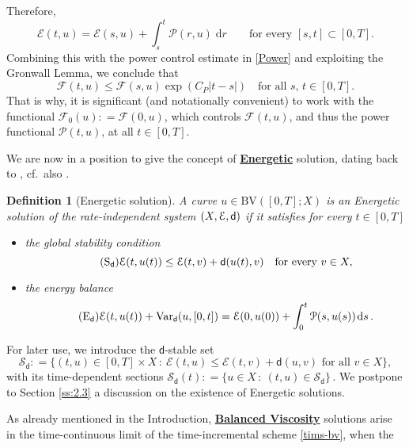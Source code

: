 \documentclass[a4paper,10pt,reqno]{amsart} %
\newtheorem{definition}[theorem]{Definition}
\numberwithin{equation}{section}
\def\dd{\;\!\mathrm{d}} %
\newcommand{\Xs}{X}
\newcommand{\BV}{\mathrm{BV}}
\newcommand{\mdn}{\mathsf{d}}
\newcommand{\md}[2]{\mathsf{d}(#1,#2)}
\newcommand{\ene}[2]{\mathcal{E}(#1,#2)}
\newcommand{\pert}[2]{\mathcal{F}(#1,#2)}
\newcommand{\perto}[1]{\mathcal{F}_0(#1)}
\newcommand{\pw}[2]{\mathcal{P}(#1,#2)}
\newcommand{\Vari}[4]{\mathrm{Var}_{#1}(#2,[#3,#4])}
\newcommand{\RIS}{(\Xs,\calE,\mdn)}
\newcommand{\stab}[1]{\mathscr{S}_{#1}}
\newcommand{\stabi}[2]{\mathscr{S}_{#1}(#2)}
\begin{document}
Therefore, 
\begin{equation}
\label{2tfc}
\ene tu = \ene su +\int_s^t \pw ru \dd r  \qquad \text{for every $[s,t]\subset[0,T]$.}
\end{equation}
 Combining this with the power control estimate in 
\eqref{Power} and exploiting the Gronwall Lemma, we conclude that 
\begin{equation}
\label{prop-pert}
\pert tu\leq \pert su \exp\left(C_P |t-s|\right) \quad \text{for all } s,\, t \in [0,T].
\end{equation}
That is why, it is significant (and notationally convenient) to work with the functional $\perto u : = \pert 0u$, which controls $\pert tu$, and thus the power functional $\pw tu$,  at all $t\in [0,T]$. 
 \par
 We are now in a position to give  the %
  concept of \underline{\textbf{Energetic}} solution, dating back to 
  \cite{MieThe99MMRI,MieThe04RIHM}, cf.\ also \cite{Miel05ERIS}.  
\begin{definition}[Energetic solution]
\label{def:en-sol}
A curve $u\in \BV([0,T];X)$ is an Energetic solution of the rate-independent system $\RIS$ if it satisfies for every $t\in [0,T]$
\begin{itemize}
\item[-] the global stability condition
\begin{equation}
\label{global-stab}
\tag{$\mathrm{S}_{\mdn}$}
\ene t{u(t)} \leq \ene tv + \md{u(t)}{v} \quad \text{for every } v \in \Xs,
\end{equation}
\item[-]  the energy balance
\begin{equation}
\label{global-enbal}
\tag{$\mathrm{E}_{\mdn}$}
\ene t{u(t)} + \Vari {\mdn}{u}0{t} = \ene 0{u(0)} +\int_0^t \pw s{u(s)} \dd s \,.
\end{equation}
\end{itemize}
\end{definition}
For later use, we introduce the $\mdn$-stable  set 
\[
\stab \mdn: = \{ (t,u) \in [0,T]\times \Xs \, : \ \ene tu \leq \ene tv + \md uv  \text{ for all } v \in \Xs\}, 
\]
 with its time-dependent sections $\stabi \mdn t : = \{ u \in \Xs\, : \ (t,u) \in \stab \mdn \}\,$. 
We postpone to Section \ref{ss:2.3} a discussion on the existence of Energetic solutions. 
\par
As already mentioned in the Introduction, 
\underline{\textbf{Balanced Viscosity}} solutions arise in the time-continuous limit of the time-incremental scheme \eqref{tims-bv}, when the 
\end{document}

